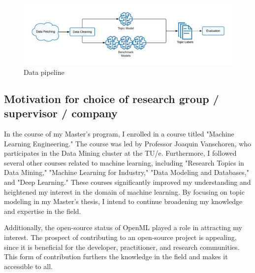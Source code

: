 \documentclass{article}
\begin{document}
\begin{figure}[h] %
    \centering
    \includegraphics[width=\textwidth]{images/data_pipeline.pdf}
    \caption{Data pipeline}
    \label{fig:data_pipeline}
\end{figure}




\subsection{Motivation for choice of research group / supervisor / company}


In the course of my Master's program, I enrolled in a course titled "Machine Learning Engineering." The course was led by Professor Joaquin Vanschoren, who participates in the Data Mining cluster at the TU/e. Furthermore, I followed several other courses related to machine learning, including "Research Topics in Data Mining," "Machine Learning for Industry," "Data Modeling and Databases," and "Deep Learning." These courses significantly improved my understanding and heightened my interest in the domain of machine learning. By focusing on topic modeling in my Master's thesis, I intend to continue broadening my knowledge and expertise in the field.

Additionally, the open-source status of OpenML played a role in attracting my interest. The prospect of contributing to an open-source project is appealing, since it is beneficial for the developer, practitioner, and research communities. This form of contribution furthers the knowledge in the field and makes it accessible to all.



\end{document}
